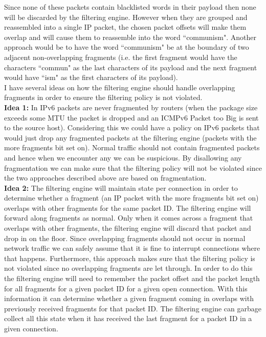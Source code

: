 Since none of these packets contain blacklisted words in their payload then none will be discarded by the filtering engine. However when they are grouped and reassembled into a single IP packet, the chosen packet offsets will make them overlap and will cause them to reassemble into the word ``communism". Another approach would be to have the word ``communism" be at the boundary of two adjacent non-overlapping fragments (i.e. the first fragment would have the characters ``commun" as the last characters of its payload and the next fragment would have ``ism" as the first characters of its payload).\\

I have several ideas on how the filtering engine should handle overlapping fragments in order to ensure the filtering policy is not violated. \\

\textbf{Idea 1: } In IPv6 packets are never fragmented by routers (when the package size exceeds some MTU the packet is dropped and an ICMPv6 Packet too Big is sent to the source host). Considering this we could have a policy on IPv6 packets that would just drop any fragmented packets at the filtering engine (packets with the more fragments bit set on). Normal traffic should not contain fragmented packets and hence when we encounter any we can be suspicious. By disallowing any fragmentation we can make sure that the filtering policy will not be violated since the two approaches described above are based on fragmentation.\\

\textbf{Idea 2: } The filtering engine will maintain state per connection in order to determine whether a fragment (an IP packet with the more fragments bit set on) overlaps with other fragments for the same packet ID. The filtering engine will forward along fragments as normal. Only when it comes across a fragment that overlaps with other fragments, the filtering engine will discard that packet and drop in on the floor. Since overlapping fragments should not occur in normal network traffic we can safely assume that it is fine to interrupt connections where that happens. Furthermore, this approach makes sure that the filtering policy is not violated since no overlapping fragments are let through. In order to do this the filtering engine will need to remember the packet offset and the packet length for all fragments for a given packet ID for a given open connection. With this information it can determine whether a given fragment coming in overlaps with previously received fragments for that packet ID. The filtering engine can garbage collect all this state when it has received the last fragment for a packet ID in a given connection.\\

